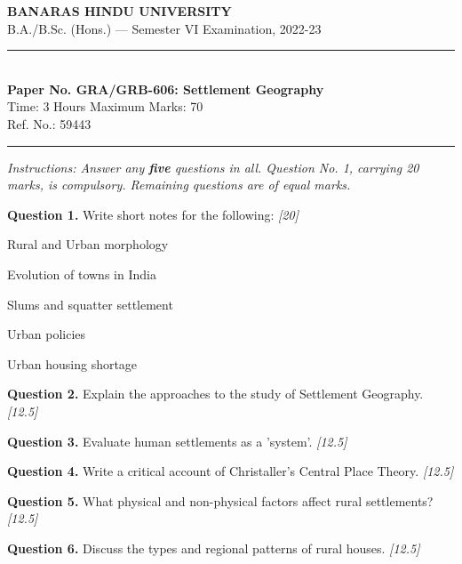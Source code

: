 \documentclass[11pt,a4paper]{article}
\newcommand{\pts}[1]{\hfill   \textit{[#1]}}
\begin{document}
\begin{center}
  {\large\bfseries BANARAS HINDU UNIVERSITY}\\[2pt]
  {\normalsize B.A./B.Sc. (Hons.) --- Semester VI Examination, 2022-23}\\[6pt]
  \rule{0.8\linewidth}{0.5pt}\\[6pt]
  {\large\bfseries Paper No. GRA/GRB-606: Settlement Geography}\\[4pt]
  {\normalsize Time: 3 Hours \hfill Maximum Marks: 70}\\[2pt]
  {\small Ref. No.: 59443}
\end{center}
\rule{\linewidth}{0.4pt}
\smallskip



\noindent   \textit{Instructions: Answer any   \textbf{five} questions in all. Question No. 1, carrying 20 marks, is compulsory. Remaining questions are of equal marks.}
\bigskip




\noindent   \textbf{Question 1.} Write short notes for the following: \pts{20}

\begin{parts}
  \item Rural and Urban morphology
  \item Evolution of towns in India
  \item Slums and squatter settlement
  \item Urban policies
  \item Urban housing shortage
\end{parts}

\medskip


\noindent   \textbf{Question 2.} Explain the approaches to the study of Settlement Geography. \pts{12.5}

\medskip


\noindent   \textbf{Question 3.} Evaluate human settlements as a 'system'. \pts{12.5}

\medskip


\noindent   \textbf{Question 4.} Write a critical account of Christaller's Central Place Theory. \pts{12.5}

\medskip


\noindent   \textbf{Question 5.} What physical and non-physical factors affect rural settlements? \pts{12.5}

\medskip


\noindent   \textbf{Question 6.} Discuss the types and regional patterns of rural houses. \pts{12.5}
\end{document}
